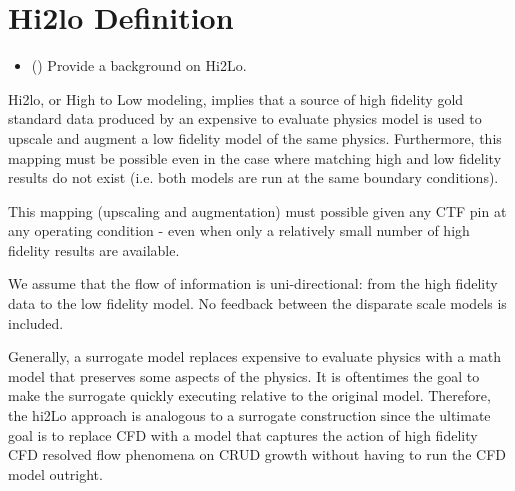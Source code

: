 \section{Hi2lo Definition}

\begin{itemize}
    \item (\checkmark) Provide a background on Hi2Lo.
\end{itemize}

Hi2lo, or High to Low modeling, implies that a source of high fidelity gold standard data produced by an expensive to evaluate physics model is used to upscale and augment a low fidelity model of the same physics.
Furthermore, this mapping must be possible even in the case where matching high and low fidelity results do not exist (i.e. both models are run at the same boundary conditions).

This mapping (upscaling and augmentation) must possible given any CTF pin at any operating condition - even when only a relatively small number of high fidelity results are available.

We assume that the flow of information is uni-directional: from the high fidelity data to the low fidelity model.  No feedback between the disparate scale models is included.

Generally, a surrogate model replaces expensive to evaluate physics with a math model that preserves some aspects of the physics.  It is oftentimes the goal to make the surrogate quickly executing relative to the original model. Therefore, the hi2Lo approach is analogous to a surrogate construction since the ultimate goal is to replace CFD with a model that captures the action of high fidelity CFD resolved flow phenomena on CRUD growth without having to run the CFD model outright.


